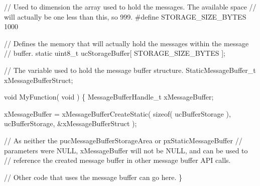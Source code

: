 \begin{DoxyPre}// Used to dimension the array used to hold the messages.  The available space
// will actually be one less than this, so 999.
\#define STORAGE\_SIZE\_BYTES 1000\end{DoxyPre}



\begin{DoxyPre}// Defines the memory that will actually hold the messages within the message
// buffer.
static uint8\_t ucStorageBuffer[ STORAGE\_SIZE\_BYTES ];\end{DoxyPre}



\begin{DoxyPre}// The variable used to hold the message buffer structure.
StaticMessageBuffer\_t xMessageBufferStruct;\end{DoxyPre}



\begin{DoxyPre}void MyFunction( void )
\{
MessageBufferHandle\_t xMessageBuffer;\end{DoxyPre}



\begin{DoxyPre}    xMessageBuffer = xMessageBufferCreateStatic( sizeof( ucBufferStorage ),
                                                 ucBufferStorage,
                                                 \&xMessageBufferStruct );\end{DoxyPre}



\begin{DoxyPre}    // As neither the pucMessageBufferStorageArea or pxStaticMessageBuffer
    // parameters were NULL, xMessageBuffer will not be NULL, and can be used to
    // reference the created message buffer in other message buffer API calls.\end{DoxyPre}



\begin{DoxyPre}    // Other code that uses the message buffer can go here.
\}\end{DoxyPre}



\begin{DoxyPre}\end{DoxyPre}
 